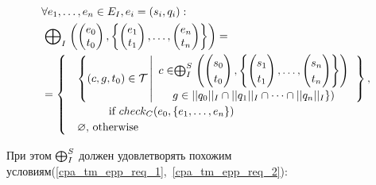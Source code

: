 \begin{equation}
\label{epp_split}
\begin{aligned}
& \forall e_1, \dots, e_n \in E_I, e_i=(s_i,q_i): \\
& \mathrel{\bigoplus}_I
\left(
\begin{pmatrix}
e_0 \\
t_0 
\end{pmatrix},
\left\{
\begin{pmatrix}
e_1 \\
t_1 
\end{pmatrix},
\dots ,
\begin{pmatrix}
e_n \\
t_n 
\end{pmatrix}
\right\}
\right) = \\
& =
\begin{cases}
& \left\lbrace 
(c, g, t_0) \in \mathcal{T}
\left| 
\begin{array}{c}
c \in \mathrel{\bigoplus}^S_I
\left(
\begin{pmatrix}
s_0 \\
t_0 
\end{pmatrix},
\left\{
\begin{pmatrix}
s_1 \\
t_1 
\end{pmatrix},
\dots ,
\begin{pmatrix}
s_n \\
t_n 
\end{pmatrix}
\right\}
\right) \\
g \in ||q_0||_I \cap ||q_1||_I \cap \dots \cap ||q_n||_I\})
\end{array}
\right.
\right\rbrace,\\
& \hspace{1cm} \mbox{if } check_C(e_0, \{e_1, \dots, e_n\})\\
& \varnothing \mbox{, otherwise}
\end{cases}
\end{aligned}
\end{equation}

При этом $\mathrel{\bigoplus}^S_I$ должен удовлетворять похожим условиям(\ref{cpa_tm_epp_req_1},~\ref{cpa_tm_epp_req_2}):

